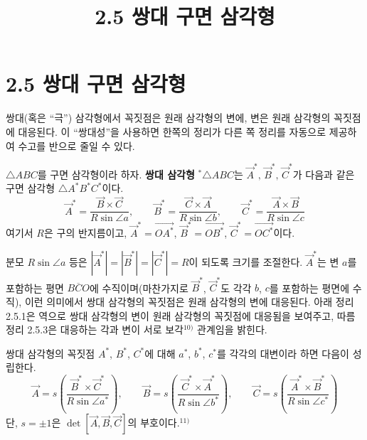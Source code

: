\documentclass{article}
\title{2.5 쌍대 구면 삼각형}
\date{}
\author{}
\begin{document}
\maketitle

\section*{2.5 쌍대 구면 삼각형}

쌍대(혹은 ``극'') 삼각형에서 꼭짓점은 원래 삼각형의 변에, 변은 원래 삼각형의 꼭짓점에 대응된다.
이 ``쌍대성''을 사용하면 한쪽의 정리가 다른 쪽 정리를 자동으로 제공하여 수고를 반으로 줄일 수 있다.

\begin{tcolorbox}[
  colback=teal!4, colframe=teal!65!black,
  title=정의 2.5.1 (쌍대 구면 삼각형),
  fonttitle=\bfseries, boxrule=0.5mm, arc=3mm]

$\triangle ABC$를 구면 삼각형이라 하자.
\textbf{쌍대 삼각형} ${}^*\!\triangle ABC$는
$\vec{A}^*,\,\vec{B}^*,\,\vec{C}^*$가 다음과 같은 구면 삼각형 $\triangle A^*B^*C^*$이다.
\[
  \vec{A}^* = \frac{\vec{B}\times\vec{C}}{R\sin\angle a},\qquad
  \vec{B}^* = \frac{\vec{C}\times\vec{A}}{R\sin\angle b},\qquad
  \vec{C}^* = \frac{\vec{A}\times\vec{B}}{R\sin\angle c}
\]
여기서 $R$은 구의 반지름이고,
$\vec{A}^* = \overrightarrow{OA^*}$, $\vec{B}^* = \overrightarrow{OB^*}$,
$\vec{C}^* = \overrightarrow{OC^*}$이다.

\end{tcolorbox}

분모 $R\sin\angle a$ 등은 $|\vec{A}^*|=|\vec{B}^*|=|\vec{C}^*|=R$이 되도록 크기를 조절한다.
$\vec{A}^*$는 변 $a$를 포함하는 평면 $\overline{BCO}$에 수직이며(마찬가지로 $\vec{B}^*$, $\vec{C}^*$도 각각 $b$, $c$를 포함하는 평면에 수직),
이런 의미에서 쌍대 삼각형의 꼭짓점은 원래 삼각형의 변에 대응된다.
아래 정리 2.5.1은 역으로 쌍대 삼각형의 변이 원래 삼각형의 꼭짓점에 대응됨을 보여주고,
따름정리 2.5.3은 대응하는 각과 변이 서로 보각$^{10)}$ 관계임을 밝힌다.

\begin{tcolorbox}[
  colback=red!4, colframe=red!60!black,
  title=정리 2.5.1,
  fonttitle=\bfseries, boxrule=0.5mm, arc=3mm]

쌍대 삼각형의 꼭짓점 $A^*$, $B^*$, $C^*$에 대해 $a^*$, $b^*$, $c^*$를 각각의 대변이라 하면 다음이 성립한다.
\[
  \vec{A} = s\!\left(\frac{\vec{B}^*\times\vec{C}^*}{R\sin\angle a^*}\right),\qquad
  \vec{B} = s\!\left(\frac{\vec{C}^*\times\vec{A}^*}{R\sin\angle b^*}\right),\qquad
  \vec{C} = s\!\left(\frac{\vec{A}^*\times\vec{B}^*}{R\sin\angle c^*}\right)
\]
단, $s = \pm 1$은 $\det[\vec{A},\vec{B},\vec{C}]$의 부호이다.$^{11)}$

\end{tcolorbox}
\end{document}
